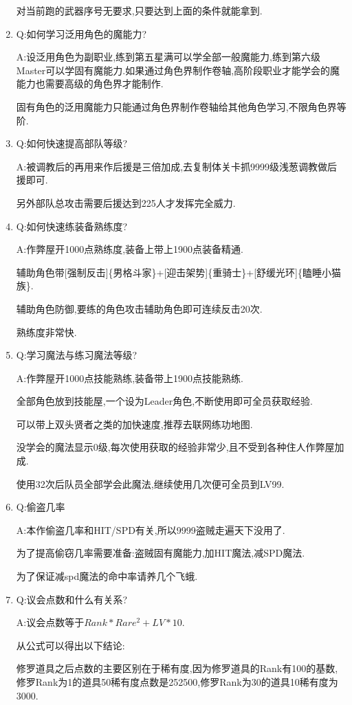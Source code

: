 \begin{enumerate}
	对当前跑的武器序号无要求,只要达到上面的条件就能拿到.

	\item
	Q:如何学习泛用角色的魔能力?

	A:设泛用角色为副职业,练到第五星满可以学全部一般魔能力,练到第六级Master可以学固有魔能力.如果通过角色界制作卷轴,高阶段职业才能学会的魔能力也需要高级的角色界才能制作.

	固有角色的泛用魔能力只能通过角色界制作卷轴给其他角色学习,不限角色界等阶.

	\item
	Q:如何快速提高部队等级?

	A:被调教后的再用来作后援是三倍加成,去复制体关卡抓9999级浅葱调教做后援即可.

	另外部队总攻击需要后援达到225人才发挥完全威力.

	\item
	Q:如何快速练装备熟练度?

	A:作弊屋开1000点熟练度,装备上带上1900点装备精通.

	辅助角色带[强制反击]\{男格斗家\}+[迎击架势]\{重骑士\}+[舒缓光环]\{瞌睡小猫族\}.

	辅助角色防御,要练的角色攻击辅助角色即可连续反击20次.

	熟练度非常快.

	\item
	Q:学习魔法与练习魔法等级?
	
	A:作弊屋开1000点技能熟练,装备带上1900点技能熟练.

	全部角色放到技能屋,一个设为Leader角色,不断使用即可全员获取经验.

	可以带上双头贤者之类的加快速度,推荐去联网练功地图.

	没学会的魔法显示0级,每次使用获取的经验非常少,且不受到各种住人作弊屋加成.

	使用32次后队员全部学会此魔法,继续使用几次便可全员到LV99.

	\item
	Q:偷盗几率

	A:本作偷盗几率和HIT/SPD有关,所以9999盗贼走遍天下没用了.

	为了提高偷窃几率需要准备:盗贼固有魔能力,加HIT魔法,减SPD魔法.

	为了保证减spd魔法的命中率请养几个飞蛾.

	\item
	Q:议会点数和什么有关系?

	A:议会点数等于$Rank*Rare^2+LV*10$.

	从公式可以得出以下结论:

	修罗道具之后点数的主要区别在于稀有度,因为修罗道具的Rank有100的基数,修罗Rank为1的道具50稀有度点数是252500,修罗Rank为30的道具10稀有度为3000.


\end{enumerate}
